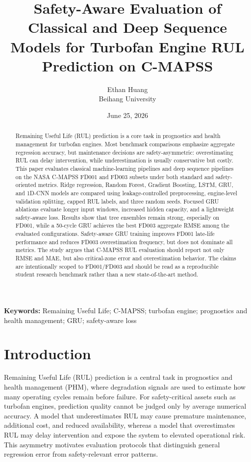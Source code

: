 \documentclass[11pt,a4paper]{article}
\title{Safety-Aware Evaluation of Classical and Deep Sequence Models for Turbofan Engine RUL Prediction on C-MAPSS}
\author{Ethan Huang\\Beihang University}
\date{June 25, 2026}
\begin{document}
\maketitle

\begin{abstract}
Remaining Useful Life (RUL) prediction is a core task in prognostics and health management for turbofan engines. Most benchmark comparisons emphasize aggregate regression accuracy, but maintenance decisions are safety-asymmetric: overestimating RUL can delay intervention, while underestimation is usually conservative but costly. This paper evaluates classical machine-learning pipelines and deep sequence pipelines on the NASA C-MAPSS FD001 and FD003 subsets under both standard and safety-oriented metrics. Ridge regression, Random Forest, Gradient Boosting, LSTM, GRU, and 1D-CNN models are compared using leakage-controlled preprocessing, engine-level validation splitting, capped RUL labels, and three random seeds. Focused GRU ablations evaluate longer input windows, increased hidden capacity, and a lightweight safety-aware loss. Results show that tree ensembles remain strong, especially on FD001, while a 50-cycle GRU achieves the best FD003 aggregate RMSE among the evaluated configurations. Safety-aware GRU training improves FD001 late-life performance and reduces FD003 overestimation frequency, but does not dominate all metrics. The study argues that C-MAPSS RUL evaluation should report not only RMSE and MAE, but also critical-zone error and overestimation behavior. The claims are intentionally scoped to FD001/FD003 and should be read as a reproducible student research benchmark rather than a new state-of-the-art method.
\end{abstract}

\noindent\textbf{Keywords:} Remaining Useful Life; C-MAPSS; turbofan engine; prognostics and health management; GRU; safety-aware loss

\section{Introduction}

Remaining Useful Life (RUL) prediction is a central task in prognostics and health management (PHM), where degradation signals are used to estimate how many operating cycles remain before failure. For safety-critical assets such as turbofan engines, prediction quality cannot be judged only by average numerical accuracy. A model that underestimates RUL may cause premature maintenance, additional cost, and reduced availability, whereas a model that overestimates RUL may delay intervention and expose the system to elevated operational risk. This asymmetry motivates evaluation protocols that distinguish general regression error from safety-relevant error patterns.
\end{document}
